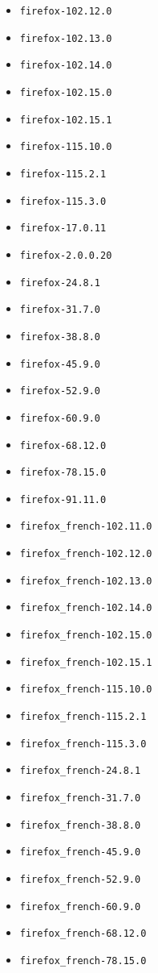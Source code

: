 \begin{multicols}{3}
\begin{itemize}
\item \verb|firefox-102.12.0|
\item \verb|firefox-102.13.0|
\item \verb|firefox-102.14.0|
\item \verb|firefox-102.15.0|
\item \verb|firefox-102.15.1|
\item \verb|firefox-115.10.0|
\item \verb|firefox-115.2.1|
\item \verb|firefox-115.3.0|
\item \verb|firefox-17.0.11|
\item \verb|firefox-2.0.0.20|
\item \verb|firefox-24.8.1|
\item \verb|firefox-31.7.0|
\item \verb|firefox-38.8.0|
\item \verb|firefox-45.9.0|
\item \verb|firefox-52.9.0|
\item \verb|firefox-60.9.0|
\item \verb|firefox-68.12.0|
\item \verb|firefox-78.15.0|
\item \verb|firefox-91.11.0|
\item \verb|firefox_french-102.11.0|
\item \verb|firefox_french-102.12.0|
\item \verb|firefox_french-102.13.0|
\item \verb|firefox_french-102.14.0|
\item \verb|firefox_french-102.15.0|
\item \verb|firefox_french-102.15.1|
\item \verb|firefox_french-115.10.0|
\item \verb|firefox_french-115.2.1|
\item \verb|firefox_french-115.3.0|
\item \verb|firefox_french-24.8.1|
\item \verb|firefox_french-31.7.0|
\item \verb|firefox_french-38.8.0|
\item \verb|firefox_french-45.9.0|
\item \verb|firefox_french-52.9.0|
\item \verb|firefox_french-60.9.0|
\item \verb|firefox_french-68.12.0|
\item \verb|firefox_french-78.15.0|

\end{itemize}
\end{multicols}
